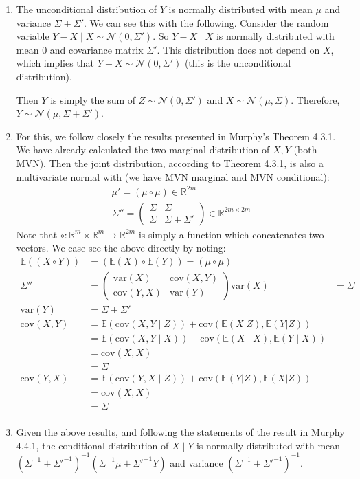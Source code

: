 \documentclass[submit]{harvardml}
\newcommand{\E}{\mathbb{E}}
\newcommand{\var}{\text{var}}
\newcommand{\cov}{\text{cov}}
\begin{document}
\begin{enumerate}[label=(\alph*)]
  \item The unconditional distribution of $Y$ is normally distributed with mean $\mu$ and variance $\Sigma + \Sigma'$. We can see this with the following. Consider the random variable $Y - X \mid X \sim \mathcal{N}(0,\Sigma')$. So $Y-X \mid X$ is normally distributed with mean $0$ and covariance matrix $\Sigma'$. This distribution does not depend on $X$, which implies that $Y - X \sim \mathcal{N}(0,\Sigma')$ (this is the unconditional distribution).

  Then $Y$ is simply the sum of $Z \sim \mathcal{N}(0,\Sigma')$ and $X \sim \mathcal{N}(\mu, \Sigma)$. Therefore, $Y \sim \mathcal{N}(\mu, \Sigma + \Sigma')$.
  \item For this, we follow closely the results presented in Murphy's Theorem 4.3.1. We have already calculated the two marginal distribution of $X,Y$ (both MVN). Then the joint distribution, according to Theorem 4.3.1, is also a multivariate normal with (we have MVN marginal and MVN conditional):
  \begin{align*}
    \mu' = (\mu \circ \mu) \in \mathbb{R}^{2m} \\
    \Sigma'' =  \left( \begin{array}{cc}
\Sigma & \Sigma\\
\Sigma & \Sigma + \Sigma' \end{array} \right) \in \mathbb{R}^{2m \times 2m}
  \end{align*}
  Note that $\circ : \mathbb{R}^m \times \mathbb{R}^m \to \mathbb{R}^{2m}$ is simply a function which concatenates two vectors.
We case see the above directly by noting:
\begin{align*}
\E((X \circ Y)) &= (\E(X) \circ \E(Y)) = (\mu \circ \mu) \\
\Sigma'' &= \left( \begin{array}{cc}
\var(X) & \cov(X,Y) \\
\cov(Y,X) & \var(Y) \end{array} \right)
\var(X) &= \Sigma \\
\var(Y) &= \Sigma + \Sigma' \\
\cov(X,Y) &= \E(\cov(X,Y \mid Z)) + \cov(\E(X|Z),\E(Y|Z)) \\
&= \E(\cov(X,Y \mid X)) + \cov(\E(X \mid X),\E(Y \mid X))\tag{let $Z = X$} \\
&= \cov(X,X) \\
&= \Sigma \\
\cov(Y,X) &= \E(\cov(Y,X \mid Z)) + \cov(\E(Y|Z), \E(X|Z)) \\
&= \cov(X,X) \\
&= \Sigma \\
\end{align*}
  \item Given the above results, and following the statements of the result in Murphy 4.4.1, the conditional distribution of $X \mid Y$ is normally distributed with mean $(\Sigma^{-1} + \Sigma'^{-1})^{-1}(\Sigma^{-1}\mu + \Sigma'^{-1}Y)$ and variance $(\Sigma^{-1} + \Sigma'^{-1})^{-1}$.
\end{enumerate}
\end{document}
